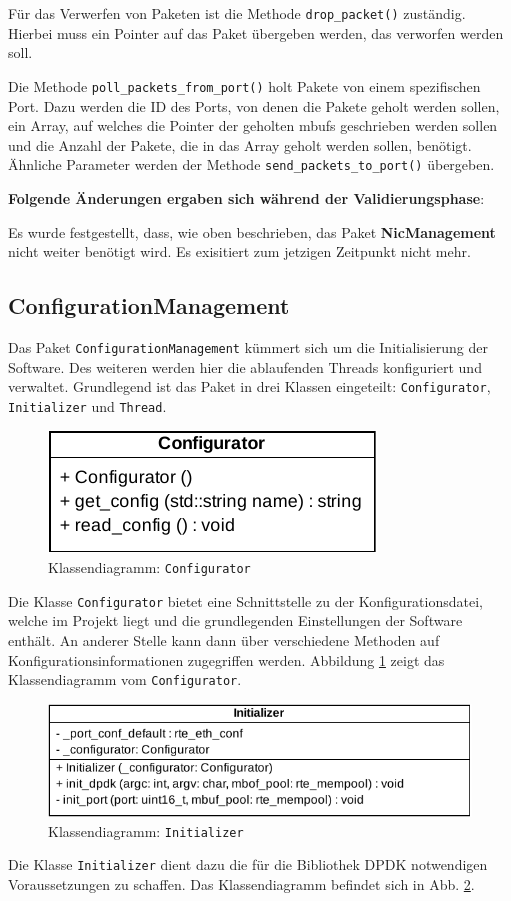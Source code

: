 \documentclass[../review_3.tex]{subfiles}
\begin{document}
Für das Verwerfen von Paketen ist die Methode \texttt{drop\_packet()} zuständig. Hierbei muss ein Pointer auf das Paket übergeben werden, das verworfen werden soll.

Die Methode  \texttt{poll\_packets\_from\_port()} holt Pakete von einem spezifischen Port. Dazu werden die ID des Ports, von denen die Pakete geholt werden sollen, ein Array, auf welches die Pointer der geholten mbufs geschrieben werden sollen und die Anzahl der Pakete, die in das Array geholt werden sollen, benötigt.
Ähnliche Parameter werden der Methode \texttt{send\_packets\_to\_port()} übergeben.

\textbf{Folgende Änderungen ergaben sich während der Validierungsphase}:

Es wurde festgestellt, dass, wie oben beschrieben, das Paket \textbf{NicManagement} nicht weiter benötigt wird. Es exisitiert zum jetzigen Zeitpunkt nicht mehr.

\subsection{ConfigurationManagement}
Das Paket \texttt{ConfigurationManagement} kümmert sich um die Initialisierung der Software. Des weiteren werden hier die ablaufenden Threads konfiguriert und verwaltet. Grundlegend ist das Paket in drei Klassen eingeteilt: \texttt{Configurator}, \texttt{Initializer} und \texttt{Thread}.

\begin{figure}[h]
    \centering
    \includegraphics[width=0.4\linewidth]{img/Configurator.pdf}
    \caption{Klassendiagramm: \texttt{Configurator}}
    \label{config}
\end{figure}
Die Klasse \texttt{Configurator} bietet eine Schnittstelle zu der Konfigurationsdatei, welche im Projekt liegt und die grundlegenden Einstellungen der Software enthält. An anderer Stelle kann dann über verschiedene Methoden auf Konfigurationsinformationen zugegriffen werden. Abbildung \ref{config} zeigt das Klassendiagramm vom \texttt{Configurator}.

\begin{figure}[h]
    \centering
    \includegraphics[width=0.7\linewidth]{img/Initializer.pdf}
    \caption{Klassendiagramm: \texttt{Initializer}}
    \label{init}
\end{figure}
Die Klasse \texttt{Initializer} dient dazu die für die Bibliothek DPDK notwendigen Voraussetzungen zu schaffen. Das Klassendiagramm befindet sich in Abb. \ref{init}.
\end{document}
